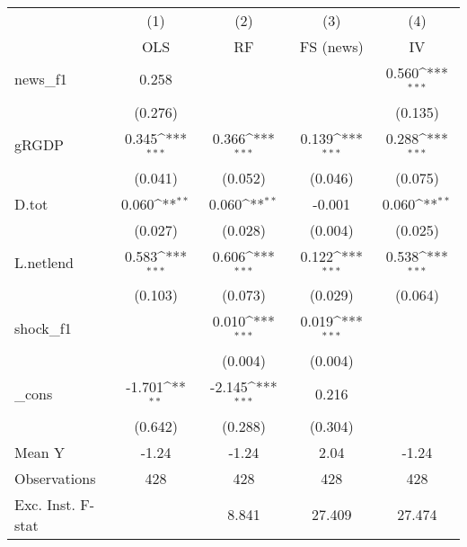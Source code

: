 {
\def\sym#1{\ifmmode^{#1}\else\(^{#1}\)\fi}
\begin{tabular}{l*{4}{c}}
\toprule
            &\multicolumn{1}{c}{(1)}&\multicolumn{1}{c}{(2)}&\multicolumn{1}{c}{(3)}&\multicolumn{1}{c}{(4)}\\
            &\multicolumn{1}{c}{OLS}&\multicolumn{1}{c}{RF}&\multicolumn{1}{c}{FS (news)}&\multicolumn{1}{c}{IV}\\
\midrule
news\_f1     &       0.258         &                     &                     &       0.560\sym{***}\\
            &     (0.276)         &                     &                     &     (0.135)         \\
\addlinespace
gRGDP       &       0.345\sym{***}&       0.366\sym{***}&       0.139\sym{***}&       0.288\sym{***}\\
            &     (0.041)         &     (0.052)         &     (0.046)         &     (0.075)         \\
\addlinespace
D.tot       &       0.060\sym{**} &       0.060\sym{**} &      -0.001         &       0.060\sym{**} \\
            &     (0.027)         &     (0.028)         &     (0.004)         &     (0.025)         \\
\addlinespace
L.netlend   &       0.583\sym{***}&       0.606\sym{***}&       0.122\sym{***}&       0.538\sym{***}\\
            &     (0.103)         &     (0.073)         &     (0.029)         &     (0.064)         \\
\addlinespace
shock\_f1    &                     &       0.010\sym{***}&       0.019\sym{***}&                     \\
            &                     &     (0.004)         &     (0.004)         &                     \\
\addlinespace
\_cons      &      -1.701\sym{**} &      -2.145\sym{***}&       0.216         &                     \\
            &     (0.642)         &     (0.288)         &     (0.304)         &                     \\
\midrule
Mean Y      &       -1.24         &       -1.24         &        2.04         &       -1.24         \\
Observations&         428         &         428         &         428         &         428         \\
Exc. Inst. F-stat&                     &       8.841         &      27.409         &      27.474         \\
\bottomrule
\end{tabular}
}
